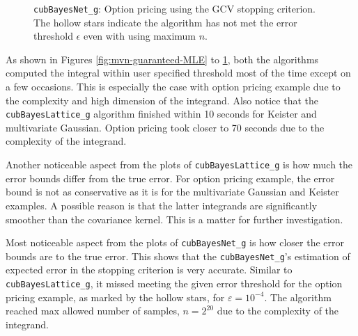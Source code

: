 \documentclass{iitthesis}          %
\newcommand{\code}[1]{\texttt{#1}}
\newcommand{\JRNote}[1]{}
\begin{document}
{{{{{{\begin{figure}
	\caption[Sobol: Option pricing guaranteed: GCV]{\code{cubBayesNet\_g}: Option pricing using the GCV stopping criterion. The hollow stars indicate the algorithm has not met the error threshold $\epsilon$ even with using maximum $n$.}
	\label{fig:Sobol-optprice-guaranteed-GCV}
\end{figure}




\JRNote{Move this to end of chapter}

As shown in Figures \ref{fig:mvn-guaranteed-MLE} to \ref{fig:Sobol-optprice-guaranteed-GCV}, both the algorithms computed the integral within user specified threshold most of the time except on a few occasions. This is especially the case with option pricing example due to the complexity and high dimension of the integrand. 
Also notice that the \code{cubBayesLattice\_g} algorithm finished within 10 seconds for Keister and multivariate Gaussian. Option pricing took closer to 70 seconds due to the complexity of the integrand.

Another noticeable aspect from the plots of \code{cubBayesLattice\_g} is how much the error bounds differ from the true error. For option pricing example, the error bound is not as conservative as it is for the multivariate Gaussian and Keister examples. A possible reason is that the latter integrands are significantly smoother than the covariance kernel.  This is a matter for further investigation.





Most noticeable aspect from the plots of \code{cubBayesNet\_g} is how closer the error bounds are to the true error. 
This shows that the \code{cubBayesNet\_g}'s estimation of expected error in the stopping criterion is very accurate. 
Similar to \code{cubBayesLattice\_g}, it missed meeting the given error threshold for the option pricing example, as marked by the hollow stars, for $\varepsilon=10^{-4}$. The algorithm reached max allowed number of samples, $n=2^{20}$ due to the complexity of the integrand.





}}}}}}
\end{document}
